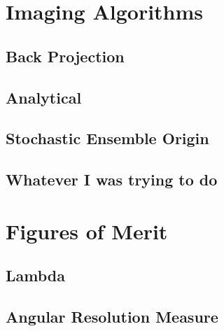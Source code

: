 \section{Imaging Algorithms}

\subsection{Back Projection}\label{ssec:backprojection}

\subsection{Analytical}\label{ssec:analytical}

\subsection{Stochastic Ensemble Origin}\label{ssec:soe}

\subsection{Whatever I was trying to do}

\section{Figures of Merit}\label{sec:fom}

\subsection{Lambda}\label{ssec:lambda}

\subsection{Angular Resolution Measure}\label{ssec:arm}


